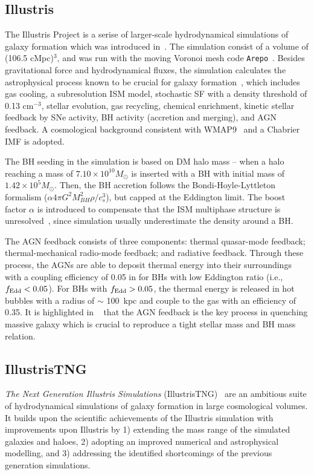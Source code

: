 \documentclass[twocolumn]{aastex631}
\begin{document}
\subsection{Illustris}
The Illustris Project is a serise of larger-scale hydrodynamical simulations of galaxy formation which was introduced in~\citet{2014MNRAS.444.1518V, 2014Natur.509..177V}. The simulation consist of a volume of (106.5 cMpc)$^3$, and was run with the moving Voronoi mesh code {\tt Arepo}~\citep{2010MNRAS.401..791S}. Besides gravitational force and hydrodynamical fluxes, the simulation calculates the astrophysical process known to be crucial for galaxy formation~\citep{2013MNRAS.436.3031V, 2014MNRAS.438.1985T}, which includes gas cooling, a subresolution ISM model, stochastic SF with a density threshold of 0.13 cm$^{-3}$, stellar evolution, gas recycling, chemical enrichment, kinetic stellar feedback by SNe activity, BH activity (accretion and merging), and AGN feedback. A cosmological background consistent with WMAP9~\citep{2013ApJS..208...19H} and a Chabrier IMF is adopted.

The BH seeding in the simulation is based on DM halo mass -- when a halo reaching a mass of $7.10 \times 10^{10} M_{\odot}$ is inserted with a BH with initial mass of $1.42 \times 10^5 M_{\odot}$. Then, the BH accretion follows the Bondi-Hoyle-Lyttleton formalism ($\alpha4\pi G^2M_{BH}^2 \rho/c_s^3$), but capped at the Eddington limit. The boost factor $\alpha$ is introduced to compensate that the ISM multiphase structure is unresolved~\citep{Springel2005, 2009MNRAS.398...53B}, since simulation usually underestimate the density around a BH.

The AGN feedback consists of three components: thermal quasar-mode feedback; thermal-mechanical radio-mode feedback; and radiative feedback. Through these process, the AGNs are able to deposit thermal energy into their surroundings with a coupling efficiency of 0.05 in for BHs with low Eddington ratio (i.e., $f_{\rm Edd} < 0.05$). For BHs with $f_{\rm Edd} > 0.05$, the thermal energy is released in hot bubbles with a radius of $\sim$ 100~kpc and couple to the gas with an efficiency of 0.35. It is highlighted in ~\citet{2014MNRAS.444.1518V} that the AGN feedback is the key process in quenching massive galaxy which is crucial to reproduce a tight stellar mass and BH mass relation. 

\subsection{IllustrisTNG}
{\it The Next Generation Illustris Simulations} (IllustrisTNG)~\citep{2018MNRAS.475..676S, Pillepich2018} are an ambitious suite of hydrodynamical simulations of galaxy formation in large cosmological volumes. It builds upon the scientific achievements of the Illustris simulation with improvements upon Illustris by 1) extending the mass range of the simulated galaxies and haloes, 2) adopting an improved numerical and astrophysical modelling, and 3) addressing the identified shortcomings of the previous generation simulations.
\end{document}
